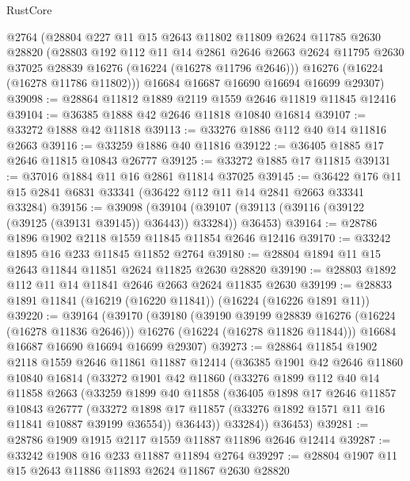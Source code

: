 \begin{lexlean}{RustCore}
\begin{coremodule}
      @2764
      (@28804
        @227
        @11
        @15
        @2643
        @11802
        @11809
        @2624
        @11785
        @2630
        @28820
        (@28803
          @192
          @112
          @11
          @14
          @2861
          @2646
          @2663
          @2624
          @11795
          @2630
          @37025
          @28839
          @16276
          (@16224 (@16278 @11796 @2646)))
        @16276
        (@16224 (@16278 @11786 @11802)))
      @16684
      @16687
      @16690
      @16694
      @16699
      @29307)
@39098 := @28864 @11812 @1889 @2119 @1559 @2646 @11819 @11845 @12416
@39104 := @36385 @1888 @42 @2646 @11818 @10840 @16814
@39107 := @33272 @1888 @42 @11818
@39113 := @33276 @1886 @112 @40 @14 @11816 @2663
@39116 := @33259 @1886 @40 @11816
@39122 := @36405 @1885 @17 @2646 @11815 @10843 @26777
@39125 := @33272 @1885 @17 @11815
@39131 := @37016 @1884 @11 @16 @2861 @11814 @37025
@39145 := @36422 @176 @11 @15 @2841 @6831 @33341 (@36422 @112 @11 @14 @2841 @2663 @33341 @33284)
@39156 := @39098
    (@39104 (@39107 (@39113 (@39116 (@39122 (@39125 (@39131 @39145)) @36443)) @33284)) @36453)
@39164 := @28786 @1896 @1902 @2118 @1559 @11845 @11854 @2646 @12416
@39170 := @33242 @1895 @16 @233 @11845 @11852 @2764
@39180 := @28804 @1894 @11 @15 @2643 @11844 @11851 @2624 @11825 @2630 @28820
@39190 := @28803 @1892 @112 @11 @14 @11841 @2646 @2663 @2624 @11835 @2630
@39199 := @28833 @1891 @11841 (@16219 (@16220 @11841)) (@16224 (@16226 @1891 @11))
@39220 := @39164
    (@39170
      (@39180
        (@39190 @39199 @28839 @16276 (@16224 (@16278 @11836 @2646)))
        @16276
        (@16224 (@16278 @11826 @11844)))
      @16684
      @16687
      @16690
      @16694
      @16699
      @29307)
@39273 := @28864
    @11854
    @1902
    @2118
    @1559
    @2646
    @11861
    @11887
    @12414
    (@36385
      @1901
      @42
      @2646
      @11860
      @10840
      @16814
      (@33272
        @1901
        @42
        @11860
        (@33276
          @1899
          @112
          @40
          @14
          @11858
          @2663
          (@33259
            @1899
            @40
            @11858
            (@36405
              @1898
              @17
              @2646
              @11857
              @10843
              @26777
              (@33272 @1898 @17 @11857 (@33276 @1892 @1571 @11 @16 @11841 @10887 @39199 @36554))
              @36443))
          @33284))
      @36453)
@39281 := @28786 @1909 @1915 @2117 @1559 @11887 @11896 @2646 @12414
@39287 := @33242 @1908 @16 @233 @11887 @11894 @2764
@39297 := @28804 @1907 @11 @15 @2643 @11886 @11893 @2624 @11867 @2630 @28820

\end{coremodule}
\end{lexlean}
